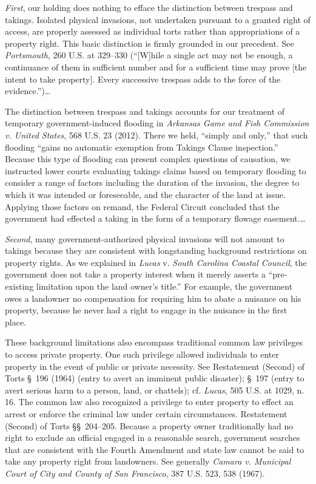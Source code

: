 \textit{First}, our holding does nothing to efface the distinction between
trespass and takings. Isolated physical invasions, not undertaken pursuant to a
granted right of access, are properly assessed as individual torts rather than
appropriations of a property right. This basic distinction is firmly grounded in
our precedent. See \textit{Portsmouth}, 260 U.S. at 329--330 (``[W]hile a single
act may not be enough, a continuance of them in sufficient number and for a
sufficient time may prove [the intent to take property]. Every successive
trespass adds to the force of the evidence.'')\ldots


The distinction between trespass and takings accounts for our treatment of
temporary government-induced flooding in \textit{Arkansas Game and Fish
Commission v. United States}, 568 U.S. 23 (2012). There we held, ``simply and
only,'' that such flooding ``gains no automatic exemption from Takings Clause
inspection.'' Because this type of flooding can present complex questions of
causation, we instructed lower courts evaluating takings claims based on
temporary flooding to consider a range of factors including the duration of the
invasion, the degree to which it was intended or foreseeable, and the character
of the land at issue. Applying those factors on remand, the Federal Circuit
concluded that the government had effected a taking in the form of a temporary
flowage easement.\ldots


\textit{Second}, many government-authorized physical invasions will not amount
to takings because they are consistent with longstanding background restrictions
on property rights. As we explained in \textit{Lucas} v. \textit{South Carolina
Coastal Council}, the government does not take a property interest when it
merely asserts a ``pre-existing limitation upon the land owner's title.'' For
example, the government owes a landowner no compensation for requiring him to
abate a nuisance on his property, because he never had a right to engage in the
nuisance in the first place. 


These background limitations also encompass traditional common law privileges to
access private property. One such privilege allowed individuals to enter
property in the event of public or private necessity. See Restatement (Second)
of Torts \S~196 (1964) (entry to avert an imminent public disaster); \S~197
(entry to avert serious harm to a person, land, or chattels); cf.
\textit{Lucas}, 505 U.S. at 1029, n. 16. The common law also recognized a
privilege to enter property to effect an arrest or enforce the criminal law
under certain circumstances. Restatement (Second) of Torts {\S}\S~204--205.
Because a property owner traditionally had no right to exclude an official
engaged in a reasonable search, government searches that are consistent with the
Fourth Amendment and state law cannot be said to take any property right from
landowners. See generally \textit{Camara v. Municipal Court of City and County
of San Francisco}, 387 U.S. 523, 538 (1967).


